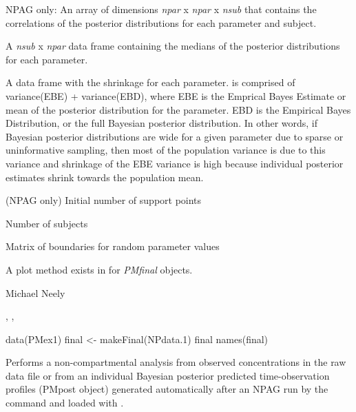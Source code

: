 \documentclass[a4paper]{book}
\begin{document}
\begin{Value}
\begin{ldescription}
\item[\code{postCor }] NPAG only: An array of dimensions \emph{npar} x \emph{npar} x \emph{nsub} that
contains the correlations of the posterior distributions for each parameter and subject.
\item[\code{postMed }] A \emph{nsub} x \emph{npar} data frame containing 
the medians of the posterior distributions for each parameter.
\item[\code{shrinkage }] A data frame with the shrinkage for each parameter.  
is comprised of variance(EBE) + variance(EBD), where EBE is the Emprical Bayes Estimate or mean of the posterior
distribution for the parameter. EBD is the Empirical Bayes Distribution, or
the full Bayesian posterior distribution. In other words, if Bayesian posterior distributions are wide
for a given parameter due to sparse or uninformative sampling, then most of the population variance is due
to this variance and shrinkage of the EBE variance is high because individual posterior estimates
shrink towards the population mean.
\item[\code{gridpts }] (NPAG only) Initial number of support points
\item[\code{nsub }] Number of subjects
\item[\code{ab }] Matrix of boundaries for random parameter values
\end{ldescription}
A plot method exists in  for \emph{PMfinal} objects.
\end{Value}
%
\begin{Author}\relax
Michael Neely
\end{Author}
%
\begin{SeeAlso}\relax
{}, ,  
\end{SeeAlso}
%
\begin{Examples}
\begin{ExampleCode}
data(PMex1)
final <- makeFinal(NPdata.1)
final
names(final)
\end{ExampleCode}
\end{Examples}
%
\begin{Description}\relax
Performs a non-compartmental analysis from observed concentrations in the raw data
file or from an individual Bayesian posterior predicted 
time-observation profiles (PMpost object) generated automatically after an NPAG run 
by the  command and loaded with .
\end{Description}
\end{document}
